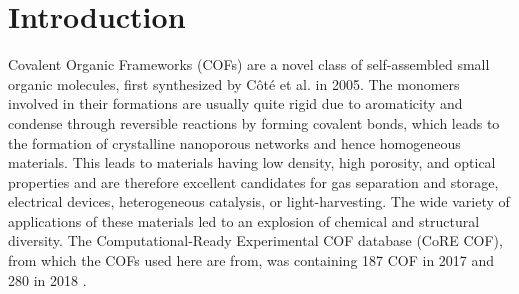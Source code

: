\chapter*{Introduction}

Covalent Organic Frameworks (COFs) are a novel class of self-assembled small organic molecules, first synthesized by C\^{o}t\'e et al. in 2005\cite{cote_porous_2005}. The monomers involved in their formations are usually quite rigid due to aromaticity and condense through reversible reactions by forming covalent bonds, which leads to the formation of crystalline nanoporous networks\cite{wu_applications_2017}\cite{Kim2019} and hence homogeneous materials. This leads to materials having low density, high porosity\cite{cote_porous_2005}, and optical properties and are therefore excellent candidates for gas separation and storage\cite{wu_applications_2017}\cite{fan_covalent_2018}, electrical devices\cite{pachfule_porous-organic-framework-templated_2013}\cite{liu_hollow_2013}\cite{kim_covalent_2018}, heterogeneous catalysis\cite{bhadra_triazine_2019}, or light-harvesting\cite{dogru_photoconductive_2013}. The wide variety of applications of these materials led to an explosion of chemical and structural diversity. The Computational-Ready Experimental COF database (CoRE COF), from which the COFs used here are from, was containing 187 COF in 2017\cite{tong_exploring_2017} and 280 in 2018 \cite{tong_computation-ready_2018}.




